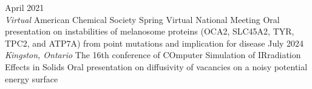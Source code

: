 \documentclass[9pt]{developercv} %
\begin{document}
\vspace{-10 pt}
\renewcommand\refname{}
\vspace{-1.5cm}


\begin{entrylist}
    \entry
        {April 2021 \\ \color{gray} \textit{Virtual}}
        {American Chemical Society Spring Virtual National Meeting}
        {}
        {Oral presentation on instabilities of melanosome proteins (OCA2, SLC45A2, TYR, TPC2, and ATP7A) from point mutations and implication for disease}
    \entry
        {July 2024 \\ \color{gray} \textit{Kingston, Ontario}}
        {The 16th conference of COmputer Simulation of IRradiation Effects in Solids}
        {}
        {Oral presentation on diffusivity of vacancies on a noisy potential energy surface}
\end{entrylist}
\end{document}
